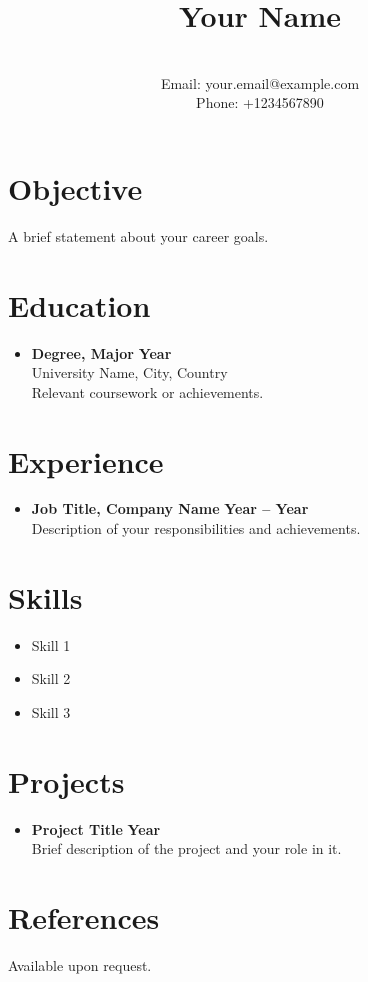 \documentclass[a4paper,10pt]{article}
\begin{document}
\title{Your Name}
\author{ \\ Email: your.email@example.com \\ Phone: +1234567890}
\date{}

\maketitle

\section*{Objective}
A brief statement about your career goals.

\section*{Education}
\begin{itemize}
    \item \textbf{Degree, Major} \hfill \textbf{Year}
    \\
    University Name, City, Country
    \\
    Relevant coursework or achievements.
\end{itemize}

\section*{Experience}
\begin{itemize}
    \item \textbf{Job Title, Company Name} \hfill \textbf{Year -- Year}
    \\
    Description of your responsibilities and achievements.
\end{itemize}

\section*{Skills}
\begin{itemize}
    \item Skill 1
    \item Skill 2
    \item Skill 3
\end{itemize}

\section*{Projects}
\begin{itemize}
    \item \textbf{Project Title} \hfill \textbf{Year}
    \\
    Brief description of the project and your role in it.
\end{itemize}

\section*{References}
Available upon request.
\end{document}
